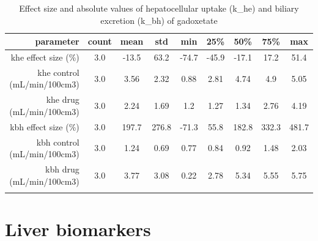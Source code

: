 \documentclass{epflreport}%
\begin{document}
%
\begin{longtable}{rcccccccc}%
\hline%
parameter&count&mean&std&min&25\%&50\%&75\%&max\\%
\hline%
khe effect size (\%)&3.0&{-}13.5&63.2&{-}74.7&{-}45.9&{-}17.1&17.2&51.4\\%
khe control (mL/min/100cm3)&3.0&3.56&2.32&0.88&2.81&4.74&4.9&5.05\\%
khe drug (mL/min/100cm3)&3.0&2.24&1.69&1.2&1.27&1.34&2.76&4.19\\%
kbh effect size (\%)&3.0&197.7&276.8&{-}71.3&55.8&182.8&332.3&481.7\\%
kbh control (mL/min/100cm3)&3.0&1.24&0.69&0.77&0.84&0.92&1.48&2.03\\%
kbh drug (mL/min/100cm3)&3.0&3.77&3.08&0.22&2.78&5.34&5.55&5.75\\%
\hline%
\caption{Effect size and absolute values of hepatocellular uptake (k\_he) and biliary excretion (k\_bh) of gadoxetate} \\%
\end{longtable}%
\clearpage%
\section{Liver biomarkers}%
\label{sec:Liverbiomarkers}%
\end{document}
